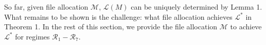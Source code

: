 \documentclass[conference]{IEEEtran}
\begin{document}
So far, given file allocation $\mathcal{M}$, $\mathcal{L}(M)$ can be uniquely determined by Lemma 1. What remains to be shown is the challenge: what file allocation achieves ${\mathcal L}^*$ in Theorem 1. In the rest of this section, we provide the file allocation $\mathcal{M}$ to achieve $\mathcal{L}^*$ for  regimes $\mathcal{R}_1-\mathcal{R}_7$.


%
%
%
\end{document}
